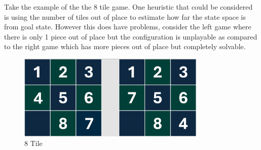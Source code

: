 \documentclass[a4paper]{article}
\begin{document}
Take the example of the the 8 tile game. One heuristic that could be considered is using the number of 
tiles out of place to estimate how far the state space is from goal state. However this does have problems, 
consider the left game where there is only 1 piece out of place but the configuration is unplayable 
as compared to the right game which has more pieces out of place but completely solvable.
\begin{figure}[h]
  \centering
  \includegraphics[width=0.8\textwidth]{assets/2024-09-12-09-45-42.png}
  \caption{8 Tile}
  \label{fig:2024-09-12-09-45-42}
\end{figure}
\end{document}
